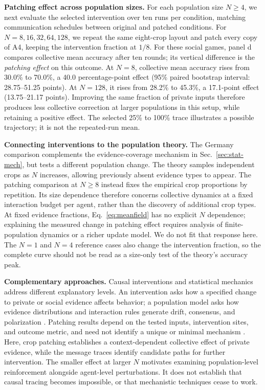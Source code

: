 \textbf{Patching effect across population sizes.} For each population size \(N\geq4\), we next evaluate the selected intervention over ten runs per condition, matching communication schedules between original and patched conditions. For \(N=8,16,32,64,128\), we repeat the same eight-crop layout and patch every copy of A4, keeping the intervention fraction at \(1/8\). For these social games, panel d compares collective mean accuracy after ten rounds; its vertical difference is the \emph{patching effect} on this outcome. At \(N=8\), collective mean accuracy rises from 30.0\% to 70.0\%, a 40.0 percentage-point effect (95\% paired bootstrap interval: 28.75--51.25 points). At \(N=128\), it rises from 28.2\% to 45.3\%, a 17.1-point effect (13.75--21.17 points). Improving the same fraction of private inputs therefore produces less collective correction at larger populations in this setup, while retaining a positive effect. The selected 25\% to 100\% trace illustrates a possible trajectory; it is not the repeated-run mean.

\textbf{Connecting interventions to the population theory.} The Germany comparison complements the evidence-coverage mechanism in Sec.~\ref{sec:stat-mech}, but tests a different population change. The theory samples independent crops as \(N\) increases, allowing previously absent evidence types to appear. The patching comparison at \(N\geq8\) instead fixes the empirical crop proportions by repetition. Its size dependence therefore concerns collective dynamics at a fixed interaction budget per agent, rather than the discovery of additional crop types. At fixed evidence fractions, Eq.~\eqref{eq:meanfield} has no explicit \(N\) dependence; explaining the measured change in patching effect requires analysis of finite-population dynamics or a richer update model. We do not fit that response here. The \(N=1\) and \(N=4\) reference cases also change the intervention fraction, so the complete curve should not be read as a size-only test of the theory's accuracy peak.

\textbf{Complementary approaches.} Causal interventions and statistical mechanics address different explanatory levels. An intervention asks how a specified change to private or social evidence affects behavior; a population model asks how evidence distributions and interaction rules generate drift, consensus, and polarization \citep{castellano2009statistical}. Patching results depend on the tested inputs, intervention sites, and outcome metric, and need not identify a unique or minimal mechanism \citep{zhang2024patching,heimersheim2024patching}. Here, crop patching establishes a context-dependent collective effect of private evidence, while the message traces identify candidate paths for further intervention. The smaller effect at larger \(N\) motivates examining population-level reinforcement alongside agent-level perturbations. It does not establish that causal tracing becomes impossible, or that mechanistic techniques cease to work.
